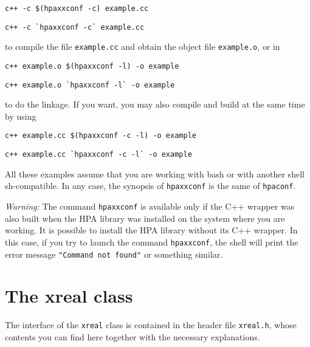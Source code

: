 \documentclass{article}
\begin{document}
\begin{verbatim}
c++ -c $(hpaxxconf -c) example.cc
\end{verbatim}

\begin{verbatim}
c++ -c `hpaxxconf -c` example.cc
\end{verbatim}
to compile the file \texttt{example.cc} and obtain the object file \texttt{example.o},
or in

\begin{verbatim}
c++ example.o $(hpaxxconf -l) -o example
\end{verbatim}

\begin{verbatim}
c++ example.o `hpaxxconf -l` -o example
\end{verbatim}
to do the linkage.
If you want, you may also compile and build at the same time by using

\begin{verbatim}
c++ example.cc $(hpaxxconf -c -l) -o example
\end{verbatim}

\begin{verbatim}
c++ example.cc `hpaxxconf -c -l` -o example
\end{verbatim}
All these examples assume that you are working
with bash or with another shell sh-compatible.
In any case, the synopsis of \texttt{hpaxxconf} is the same of \texttt{hpaconf}.

\textit{Warning:}
The command \texttt{hpaxxconf} is available only if
the C++ wrapper was also built when the HPA library was installed on 
the system where you are working.
It is possible to install the HPA library without
its C++ wrapper. In this case, if you try to launch
the command \texttt{hpaxxconf}, the shell will print
the error message \texttt{"Command not found"} or
something similar.


\hypertarget{xreal_class}{}
\section{The xreal class}
The interface of the \texttt{xreal} class is
contained in the header file \texttt{xreal.h},
whose contents you can find here together
with the necessary explanations.
\end{document}
